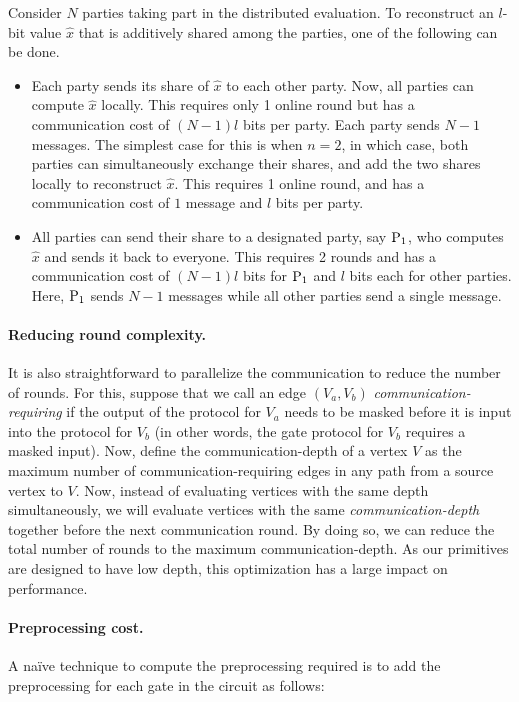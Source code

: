 Consider $N$ parties taking part in the distributed evaluation. To reconstruct an $l$-bit value $\hat{x}$ that is additively shared among the parties, one of the following can be done.
\begin{itemize}
  \item Each party sends its share of $\hat{x}$ to each other party. Now, all parties can compute $\hat{x}$ locally. This requires only 1 online round but has a communication cost of $(N-1)l$ bits per party. Each party sends $N-1$ messages. The simplest case for this is when $n=2$, in which case, both parties can simultaneously exchange their shares, and add the two shares locally to reconstruct $\hat{x}$. This requires 1 online round, and has a communication cost of $1$ message and $l$ bits per party. 

  \item All parties can send their share to a designated party, say $\textnormal{P}_1$, who computes $\hat{x}$ and sends it back to everyone. This requires 2 rounds and has a communication cost of $(N-1)l$ bits for $\textnormal{P}_1$ and $l$ bits each for other parties. Here, $\textnormal{P}_1$ sends $N-1$ messages while all other parties send a single message.
\end{itemize}


\paragraph{Reducing round complexity.} It is also straightforward to parallelize the communication to reduce the number of rounds. For this, suppose that we call an edge $(V_a, V_b)$ \textit{communication-requiring} if the output of the protocol for $V_a$ needs to be masked before it is input into the protocol for $V_b$ (in other words, the gate protocol for $V_b$ requires a masked input). Now, define the communication-depth of a vertex $V$ as the maximum number of communication-requiring edges in any path from a source vertex to $V$. Now, instead of evaluating vertices with the same depth simultaneously, we will evaluate vertices with the same \textit{communication-depth} together before the next communication round. By doing so, we can reduce the total number of rounds to the maximum communication-depth.
As our primitives are designed to have low depth, this optimization has a large impact on performance. 

\paragraph{Preprocessing cost.}
A na{\"i}ve technique to compute the preprocessing required is to add the preprocessing for each gate in the circuit as follows:

